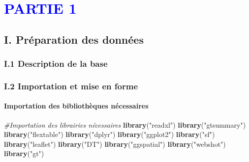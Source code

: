 \documentclass[
]{article}
\author{}
\date{\vspace{-2.5em}}
\newenvironment{Shaded}{\begin{snugshade}}{\end{snugshade}}
\newcommand{\CommentTok}[1]{\textcolor[rgb]{0.56,0.35,0.01}{\textit{#1}}}
\newcommand{\FunctionTok}[1]{\textcolor[rgb]{0.13,0.29,0.53}{\textbf{#1}}}
\newcommand{\NormalTok}[1]{#1}
\newcommand{\StringTok}[1]{\textcolor[rgb]{0.31,0.60,0.02}{#1}}
\begin{document}


\tableofcontents

\hypertarget{section}{%
\section{\texorpdfstring{\textcolor{blue}{PARTIE 1}}{}}\label{section}}

\hypertarget{i.-pruxe9paration-des-donnuxe9es}{%
\subsection{I. Préparation des
données}\label{i.-pruxe9paration-des-donnuxe9es}}

\hypertarget{i.1-description-de-la-base}{%
\subsubsection{I.1 Description de la
base}\label{i.1-description-de-la-base}}

\hypertarget{i.2-importation-et-mise-en-forme}{%
\subsubsection{\texorpdfstring{\textbf{I.2 Importation et mise en
forme}}{I.2 Importation et mise en forme}}\label{i.2-importation-et-mise-en-forme}}

\hypertarget{importation-des-bibliothuxe8ques-nuxe9cessaires}{%
\paragraph{Importation des bibliothèques
nécessaires}\label{importation-des-bibliothuxe8ques-nuxe9cessaires}}

\begin{Shaded}
\begin{Highlighting}[]
\CommentTok{\#Importation des librairies nécessaires}
\FunctionTok{library}\NormalTok{(}\StringTok{"readxl"}\NormalTok{)}
\FunctionTok{library}\NormalTok{(}\StringTok{"gtsummary"}\NormalTok{)}
\FunctionTok{library}\NormalTok{(}\StringTok{"flextable"}\NormalTok{)}
\FunctionTok{library}\NormalTok{(}\StringTok{"dplyr"}\NormalTok{)}
\FunctionTok{library}\NormalTok{(}\StringTok{"ggplot2"}\NormalTok{)}
\FunctionTok{library}\NormalTok{(}\StringTok{"sf"}\NormalTok{)}
\FunctionTok{library}\NormalTok{(}\StringTok{"leaflet"}\NormalTok{)}
\FunctionTok{library}\NormalTok{(}\StringTok{"DT"}\NormalTok{)}
\FunctionTok{library}\NormalTok{(}\StringTok{"ggspatial"}\NormalTok{)}
\FunctionTok{library}\NormalTok{(}\StringTok{"webshot"}\NormalTok{)}
\FunctionTok{library}\NormalTok{(}\StringTok{"gt"}\NormalTok{)}
\end{Highlighting}
\end{Shaded}
\end{document}
